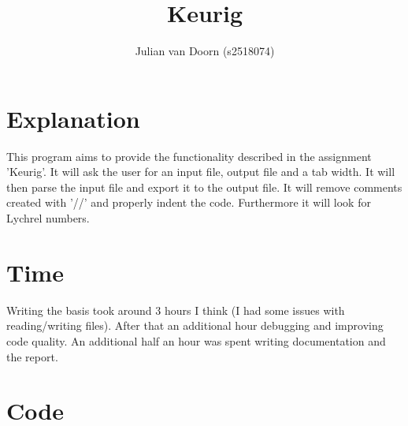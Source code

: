 \documentclass[10pt]{article}
\title{Keurig}
\author{Julian van Doorn (s2518074)}
\begin{document}

\maketitle

\section{Explanation}
This program aims to provide the functionality described in the assignment 'Keurig'. It will ask the user for an input file, output file and a tab width. It will then parse the input file and export it to the output file. It will remove comments created with '//' and properly indent the code. Furthermore it will look for Lychrel numbers.

\section{Time}
Writing the basis took around 3 hours I think (I had some issues with reading/writing files). After that an additional hour debugging and improving code quality. An additional half an hour was spent writing documentation and the report.

\section*{Code}

\end{document}
